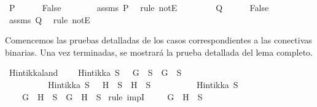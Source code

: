 \begin{isabellebody}
\ {\isachardoublequoteopen}P{\isachardoublequoteclose}\isanewline
\ \ \ \ \isamarkupfalse%
\ {\isachardoublequoteopen}False{\isachardoublequoteclose}\isanewline
\ \ \ \ \ \ \isamarkupfalse%
\ assms{\isacharparenleft}{}{\isacharparenright}\ {\isacartoucheopen}P{\isacartoucheclose}\ \isamarkupfalse%
\ {\isacharparenleft}rule\ notE{\isacharparenright}\isanewline
\ \ \isamarkupfalse%
\isanewline
\ \ \ \ \isamarkupfalse%
\ {\isachardoublequoteopen}Q{\isachardoublequoteclose}\isanewline
\ \ \ \ \isamarkupfalse%
\ {\isachardoublequoteopen}False{\isachardoublequoteclose}\isanewline
\ \ \ \ \ \ \isamarkupfalse%
\ assms{\isacharparenleft}{}{\isacharparenright}\ {\isacartoucheopen}Q{\isacartoucheclose}\ \isamarkupfalse%
\ {\isacharparenleft}rule\ notE{\isacharparenright}\isanewline
\ \ \isamarkupfalse%
\isanewline
{}\isamarkupfalse%
%
\endisatagproof
{\isafoldproof}%
%
\isadelimproof
%
\endisadelimproof
%
\begin{isamarkuptext}%
Comencemos las pruebas detalladas de los casos correspondientes a 
  las conectivas binarias. Una vez terminadas, se mostrará la prueba 
  detallada del lema completo.%
\end{isamarkuptext}\isamarkuptrue%
\isamarkupfalse%
\ Hintikka{\isacharunderscore}l{}{}{\isacharunderscore}and{\isacharcolon}\ \isanewline
\ \ \ {\isachardoublequoteopen}Hintikka\ S\ {\isasymLongrightarrow}\ \isactrlbold {\isasymnot}\ G\ {\isasymin}\ S\ {\isasymlongrightarrow}\ G\ {\isasymnotin}\ S{\isachardoublequoteclose}\isanewline
\ \ \ \ \ \ \ \ \ \ {\isachardoublequoteopen}Hintikka\ S\ {\isasymLongrightarrow}\ \isactrlbold {\isasymnot}\ H\ {\isasymin}\ S\ {\isasymlongrightarrow}\ H\ {\isasymnotin}\ S{\isachardoublequoteclose}\isanewline
\ \ \ \ \ \ \ \ \ \ {\isachardoublequoteopen}Hintikka\ S{\isachardoublequoteclose}\isanewline
\ \ \ {\isachardoublequoteopen}\isactrlbold {\isasymnot}\ {\isacharparenleft}G\ \isactrlbold {\isasymand}\ H{\isacharparenright}\ {\isasymin}\ S\ {\isasymlongrightarrow}\ G\ \isactrlbold {\isasymand}\ H\ {\isasymnotin}\ S{\isachardoublequoteclose}\isanewline
%
\isadelimproof
%
\endisadelimproof
%
\isatagproof
{}\isamarkupfalse%
\ {\isacharparenleft}rule\ impI{\isacharparenright}\isanewline
\ \ \isamarkupfalse%
\ {\isachardoublequoteopen}\isactrlbold {\isasymnot}\ {\isacharparenleft}G\ \isactrlbold {\isasymand}\ H{\isacharparenright}\ {\isasymin}\ S{\isachardoublequoteclose}\isanewline

\end{isabellebody}
